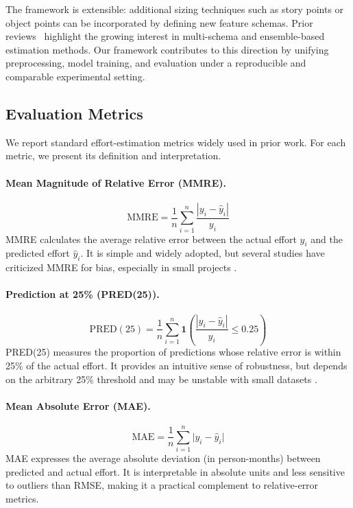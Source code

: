 \documentclass[11pt,a4paper]{article}
\begin{document}
The framework is extensible: additional sizing techniques such as story points or object points can be incorporated by defining new feature schemas. Prior reviews~\cite{tanveer2023survey,azzeh2019cross} highlight the growing interest in multi-schema and ensemble-based estimation methods. Our framework contributes to this direction by unifying preprocessing, model training, and evaluation under a reproducible and comparable experimental setting.

\subsection{Evaluation Metrics}
We report standard effort-estimation metrics widely used in prior work.
For each metric, we present its definition and interpretation.

\paragraph{Mean Magnitude of Relative Error (MMRE).}
\begin{equation}
\mathrm{MMRE} = \frac{1}{n}\sum_{i=1}^{n}\frac{|y_i-\hat{y}_i|}{y_i}
\label{eq:mmre}
\end{equation}
MMRE calculates the average relative error between the actual effort $y_i$ 
and the predicted effort $\hat{y}_i$. It is simple and widely adopted, but 
several studies have criticized MMRE for bias, especially in small projects 
\cite{kitchenham2001evaluating,foss2003bias}.

\paragraph{Prediction at 25\% (PRED(25)).}
\begin{equation}
\mathrm{PRED}(25) = \frac{1}{n}\sum_{i=1}^{n}\mathbf{1}\!\left(\frac{|y_i-\hat{y}_i|}{y_i}\le 0.25\right)
\label{eq:pred25}
\end{equation}
PRED(25) measures the proportion of predictions whose relative error is 
within 25\% of the actual effort. It provides an intuitive sense of 
robustness, but depends on the arbitrary 25\% threshold and may be 
unstable with small datasets \cite{kitchenham2001evaluating}.

\paragraph{Mean Absolute Error (MAE).}
\begin{equation}
\mathrm{MAE} = \frac{1}{n}\sum_{i=1}^{n}\bigl|y_i-\hat{y}_i\bigr|
\label{eq:mae}
\end{equation}
MAE expresses the average absolute deviation (in person-months) between 
predicted and actual effort. It is interpretable in absolute units and less 
sensitive to outliers than RMSE, making it a practical complement to 
relative-error metrics.
\end{document}
